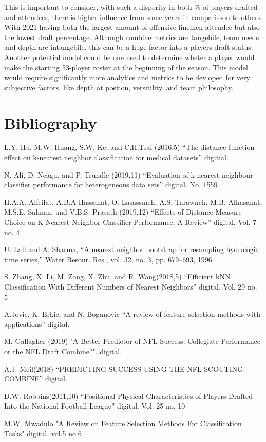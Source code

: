 \documentclass[confrence]{IEEEtran}
\begin{document}
This is important to consider, with such a disperity in both \% of players drafted and attendees, there is higher influence from some years in comparisson to others.
With 2021 having both the largest amount of offensive linemen attendee but also the lowest draft percentage. 
Although combine metrics are tangebile, team needs and depth are intangebile, this can be a huge factor into a players draft status.
Another potential model could be one used to determine wheter a player would make the starting 53-player roster at the beginning of the season.
This model would require significantly more analytics and metrics to be devloped for very subjective factors, like depth at postion, versitility, and team philosophy.

\section*{Bibliography}
L.Y. Hu, M.W. Huang, S.W. Ke, and C.H.Tsai (2016,5) “The distance function effect on k-nearest neighbor classification for medical datasets” digitial.

N. Ali, D. Neagu, and P. Trundle (2019,11) “Evaluation of k-nearest neighbour classifier performance for heterogeneous data sets” digital. No. 1559 

H.A.A. Alfeilat, A.B.A Hassanat, O. Lasassmeh, A.S. Tarawneh, M.B. Alhasanat, M.S.E. Salman, and V.B.S. Prasath (2019,12) “Effects of Distance Measure Choice on K-Nearest Neighbor Classifier Performance: A Review” digital. Vol. 7 no. 4 

U. Lall and A. Sharma, “A nearest neighbor bootstrap for resampling
hydrologic time series,” Water Resour. Res., vol. 32, no. 3, pp. 679–693,
1996.

S. Zhang, X. Li, M. Zong, X. Zhu, and R. Wang(2018,5) “Efficient kNN Classification With Different Numbers of Nearest Neighbors” digital. Vol. 29 no. 5

A.Jovic, K. Brkic, and N. Bogunovic “A review of feature selection methods with applications” digital.

M. Gallagher (2019) "A Better Predictor of NFL Success: Collegiate Performance or the NFL Draft Combine?". digital. 

A.J. Meil(2018) “PREDICTING SUCCESS USING THE NFL SCOUTING COMBINE” digital. 

D.W. Robbins(2011,10) “Positional Physical Characteristics of Players Drafted Into the National Football League” digital. Vol. 25 no. 10 

M.W. Mwadulo "A Review on Feature Selection Methods For Classification Tasks" digital. vol.5 no.6
  
\end{document}
